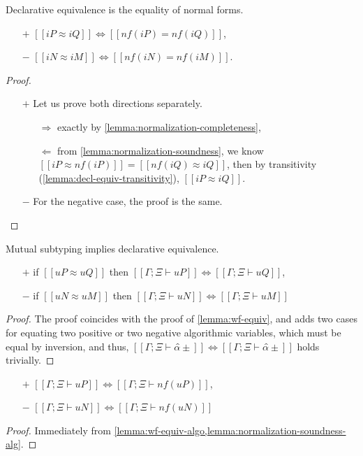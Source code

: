 \begin{lemma}
  \label{lemma:decl-equiv-algorithmization}
  Declarative equivalence is the equality of normal forms. 
  \begin{itemize}
    \item[$+$] $[[iP ≈ iQ]] \iff [[nf(iP) = nf(iQ)]]$,
    \item[$-$] $[[iN ≈ iM]] \iff [[nf(iN) = nf(iM)]]$.
  \end{itemize}
\end{lemma}
\begin{proof} \hfill
  \begin{itemize}
    \item[$+$] Let us prove both directions separately.
    \begin{itemize}
      \item[$\Rightarrow$] 
        exactly by \cref{lemma:normalization-completeness},
      \item[$\Leftarrow$] 
        from \cref{lemma:normalization-soundness}, we know
        $[[iP ≈ nf(iP)]] = [[nf(iQ) ≈ iQ]]$, then by transitivity (\cref{lemma:decl-equiv-transitivity}),
        $[[iP ≈ iQ]]$.
    \end{itemize}
    \item[$-$] For the negative case, the proof is the same.
  \end{itemize}
\end{proof}

\begin{lemma}
  \label{lemma:wf-equiv-algo}
  Mutual subtyping implies declarative equivalence.
  \begin{itemize}
  \item[$+$] if $[[uP ≈ uQ]]$ then $[[Γ; Ξ ⊢ uP]] \iff [[Γ; Ξ ⊢ uQ]]$,
  \item[$-$] if $[[uN ≈ uM]]$ then $[[Γ; Ξ ⊢ uN]] \iff [[Γ; Ξ ⊢ uM]]$
  \end{itemize}
\end{lemma}
\begin{proof}
  The proof coincides with the proof of \cref{lemma:wf-equiv},
  and adds two cases for equating two positive or two negative algorithmic variables,
  which must be equal by inversion, and thus, 
  $[[Γ; Ξ ⊢ α̂±]] \iff [[Γ; Ξ  ⊢ α̂±]]$ holds trivially.
\end{proof}

\begin{corollary}
  \label{corollary:wf-nf-algo}
  \begin{itemize}
    \item[$+$] $[[Γ; Ξ ⊢ uP]] \iff [[Γ; Ξ ⊢ nf(uP)]]$,
    \item[$-$] $[[Γ; Ξ ⊢ uN]] \iff [[Γ; Ξ ⊢ nf(uN)]]$
  \end{itemize}
\end{corollary}
\begin{proof}
  Immediately from \cref{lemma:wf-equiv-algo,lemma:normalization-soundness-alg}.
\end{proof}

